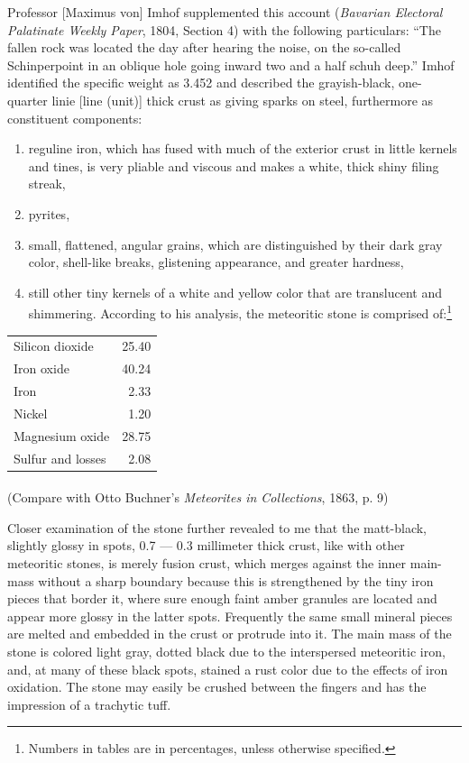 \documentclass[a4paper, 12pt, oneside]{article}
\begin{document}
Professor [Maximus von] Imhof supplemented this account (\emph{Bavarian Electoral Palatinate Weekly Paper}, 1804, Section 4) with the following particulars: ``The fallen rock was located the day after hearing the noise, on the so-called Schinperpoint in an oblique hole going inward two and a half schuh deep.'' Imhof identified the specific weight as 3.452 and described the grayish-black, one-quarter linie [line (unit)] thick crust as giving sparks on steel, furthermore as constituent components:
\begin{enumerate}
    \item reguline iron, which has fused with much of the exterior crust in little kernels and tines, is very pliable and viscous and makes a white, thick shiny filing streak,
    \item pyrites,
    \item small, flattened, angular grains, which are distinguished by their dark gray color, shell-like breaks, glistening appearance, and greater hardness,
    \item still other tiny kernels of a white and yellow color that are translucent and shimmering. According to his analysis, the meteoritic stone is comprised of:\footnote{Numbers in tables are in percentages, unless otherwise specified.}
\end{enumerate}
\begin{center}
    \begin{tabular}{l r} 
    Silicon dioxide & 25.40\\
    Iron oxide & 40.24\\
    Iron & 2.33\\
    Nickel & 1.20\\
    Magnesium oxide & 28.75\\
    Sulfur and losses & 2.08\\
    \end{tabular}
\end{center}
\paragraph*{}
(Compare with Otto Buchner's \emph{Meteorites in Collections}, 1863, p. 9)

Closer examination of the stone further revealed to me that the matt-black, slightly glossy in spots, 0.7 --- 0.3 millimeter thick crust, like with other meteoritic stones, is merely fusion crust, which merges against the inner main-mass without a sharp boundary because this is strengthened by the tiny iron pieces that border it, where sure enough faint amber granules are located and appear more glossy in the latter spots. Frequently the same small mineral pieces are melted and embedded in the crust or protrude into it. The main mass of the stone is colored light gray, dotted black due to the interspersed meteoritic iron, and, at many of these black spots, stained a rust color due to the effects of iron oxidation. The stone may easily be crushed between the fingers and has the impression of a trachytic tuff.
\end{document}
